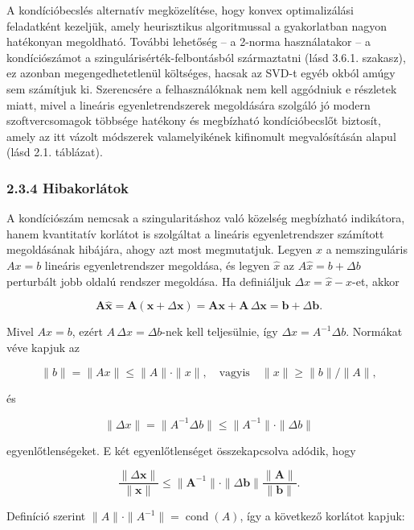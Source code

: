 \documentclass[
  magyar,
  11pt]{article}
\providecommand{\boldsymbol}[1]{\mathbf{#1}}
\begin{document}
A kondícióbecslés alternatív megközelítése, hogy konvex optimalizálási
feladatként kezeljük, amely heurisztikus algoritmussal a gyakorlatban
nagyon hatékonyan megoldható. További lehetőség -- a 2-norma
használatakor -- a kondíciószámot a szingulárisérték-felbontásból
származtatni (lásd 3.6.1. szakasz), ez azonban megengedhetetlenül
költséges, hacsak az SVD-t egyéb okból amúgy sem számítjuk ki.
Szerencsére a felhasználóknak nem kell aggódniuk e részletek miatt,
mivel a lineáris egyenletrendszerek megoldására szolgáló jó modern
szoftvercsomagok többsége hatékony és megbízható kondícióbecslőt
biztosít, amely az itt vázolt módszerek valamelyikének kifinomult
megvalósításán alapul (lásd 2.1. táblázat).

\subsubsection{2.3.4 Hibakorlátok}\label{hibakorluxe1tok}

A kondíciószám nemcsak a szingularitáshoz való közelség megbízható
indikátora, hanem kvantitatív korlátot is szolgáltat a lineáris
egyenletrendszer számított megoldásának hibájára, ahogy azt most
megmutatjuk. Legyen \(x\) a nemszinguláris \(Ax = b\) lineáris
egyenletrendszer megoldása, és legyen \(\hat{x}\) az
\(A\hat{x} = b + \Delta b\) perturbált jobb oldalú rendszer megoldása.
Ha definiáljuk \(\Delta x = \hat{x} - x\)-et, akkor

\[\boldsymbol{A}\hat{\boldsymbol{x}} = \boldsymbol{A}(\boldsymbol{x} + \Delta\boldsymbol{x}) = \boldsymbol{A}\boldsymbol{x} + \boldsymbol{A}\,\Delta\boldsymbol{x} = \boldsymbol{b} + \Delta\boldsymbol{b}.\]

Mivel \(Ax = b\), ezért \(A\,\Delta x = \Delta b\)-nek kell teljesülnie,
így \(\Delta x = A^{-1}\Delta b\). Normákat véve kapjuk az

\[\|b\| = \|Ax\| \le \|A\| \cdot \|x\|, \quad \text{vagyis} \quad \|x\| \ge \|b\|/\|A\|,\]

és

\[\|\Delta x\| = \|A^{-1}\Delta b\| \le \|A^{-1}\| \cdot \|\Delta b\|\]

egyenlőtlenségeket. E két egyenlőtlenséget összekapcsolva adódik, hogy

\[\frac{\|\Delta \boldsymbol{x}\|}{\|\boldsymbol{x}\|} \leq \|\boldsymbol{A}^{-1}\| \cdot \|\Delta \boldsymbol{b}\| \frac{\|\boldsymbol{A}\|}{\|\boldsymbol{b}\|}.\]

Definíció szerint \(\|A\| \cdot \|A^{-1}\| = \operatorname{cond}(A)\),
így a következő korlátot kapjuk:
\end{document}

